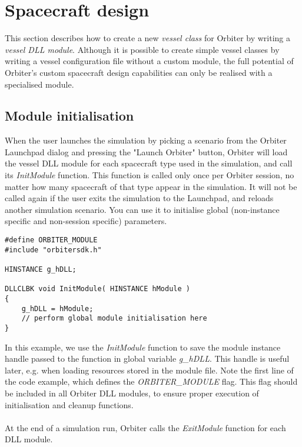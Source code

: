 \documentclass[Orbiter Developer Manual.tex]{subfiles}
\begin{document}
\section{Spacecraft design}
This section describes how to create a new \textit{vessel class} for Orbiter by writing a \textit{vessel DLL module}. Although it is possible to create simple vessel classes by writing a vessel configuration file without a custom module, the full potential of Orbiter's custom spacecraft design capabilities can only be realised with a specialised module.\\



\subsection{Module initialisation}
When the user launches the simulation by picking a scenario from the Orbiter Launchpad dialog and pressing the "Launch Orbiter" button, Orbiter will load the vessel DLL module for each spacecraft type used in the simulation, and call its \textit{InitModule} function. This function is called only once per Orbiter session, no matter how many spacecraft of that type appear in the simulation. It will not be called again if the user exits the simulation to the Launchpad, and reloads another simulation scenario. You can use it to initialise global (non-instance specific and non-session specific) parameters.

\begin{lstlisting}
#define ORBITER_MODULE
#include "orbitersdk.h"

HINSTANCE g_hDLL;

DLLCLBK void InitModule( HINSTANCE hModule )
{
	g_hDLL = hModule;
	// perform global module initialisation here
}
\end{lstlisting}

\noindent
In this example, we use the \textit{InitModule} function to save the module instance handle passed to the function in global variable \textit{g\_hDLL}. This handle is useful later, e.g. when loading resources stored in the module file. Note the first line of the code example, which defines the \textit{ORBITER\_MODULE} flag. This flag should be included in all Orbiter DLL modules, to ensure proper execution of initialisation and cleanup functions.\\
\\
At the end of a simulation run, Orbiter calls the \textit{ExitModule} function for each DLL module.
\end{document}
